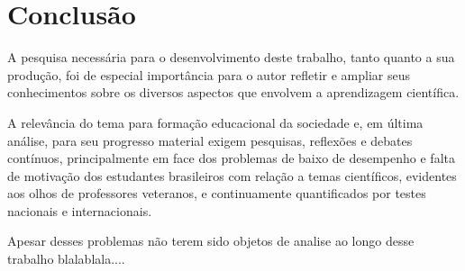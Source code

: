 \chapter*[Conclusão]{Conclusão}

A pesquisa necessária para o desenvolvimento deste trabalho, tanto quanto a sua produção, foi de especial importância para o autor refletir e ampliar seus conhecimentos sobre os diversos aspectos que envolvem a aprendizagem científica. 

A relevância do tema para formação educacional da sociedade e, em última análise, para seu progresso material exigem pesquisas, reflexões e debates contínuos, principalmente em face dos problemas de baixo de desempenho e falta de motivação dos estudantes brasileiros com relação a temas científicos, evidentes aos olhos de professores veteranos, e continuamente quantificados por testes nacionais e internacionais. 


Apesar desses problemas não terem sido objetos de analise ao longo desse trabalho blalablala....